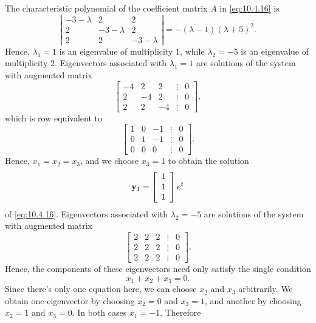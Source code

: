 \begin{examplesolution}
\solution The characteristic polynomial of the coefficient matrix $A$ in \eqref{eq:10.4.16} is
\[
  \left|
  \begin{array}{ccc}
    -3-\lambda & 2          & 2          \\
    2          & -3-\lambda & 2          \\
    2          & 2          & -3-\lambda
  \end{array}\right|=-(\lambda-1)(\lambda+5)^{2}.
\]
Hence, $\lambda_{1}=1$ is an eigenvalue of multiplicity $1$, while $\lambda_{2}=-5$ is an eigenvalue
of multiplicity $2$. Eigenvectors associated with $\lambda_{1}=1$ are solutions of the system with
augmented matrix
\[
  \left[
  \begin{array}{rrrcr}
    -4 & 2  & 2  & \vdots & 0 \\
    2  & -4 & 2  & \vdots & 0 \\
    2  & 2  & -4 & \vdots & 0
  \end{array}\right],
\]
which is row equivalent to
\[
  \left[
  \begin{array}{rrrcr}
    1 & 0 & -1 & \vdots & 0 \\
    0 & 1 & -1 & \vdots & 0 \\
    0 & 0 & 0  & \vdots & 0
  \end{array}\right].
\]
Hence, $x_{1}=x_{2}=x_{3}$, and we choose $x_{3}=1$ to obtain the solution
\begin{equation}
  \label{eq:10.4.17}{\bf y}_{1}=\left[
  \begin{array}{r}
    1 \\
    1 \\
    1
  \end{array}\right]e^{t}
\end{equation}
of \eqref{eq:10.4.16}. Eigenvectors associated with $\lambda_{2}=-5$ are solutions of the system
with augmented matrix
\[
  \left[
  \begin{array}{rrrcr}
    2 & 2 & 2 & \vdots & 0 \\
    2 & 2 & 2 & \vdots & 0 \\
    2 & 2 & 2 & \vdots & 0
  \end{array}\right].
\]
Hence, the components of these eigenvectors need only satisfy the single condition
\[
  x_{1}+x_{2}+x_{3}=0.
\]
Since there's only one equation here, we can choose $x_{2}$ and $x_{3}$ arbitrarily. We obtain one
eigenvector by choosing $x_{2}=0$ and $x_{3}=1$, and another by choosing $x_{2}=1$ and $x_{3}=0$. In
both cases $x_{1}=-1$. Therefore

\end{examplesolution}

